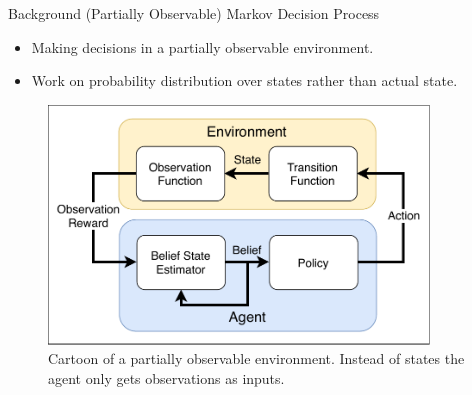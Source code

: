 \begin{exampleblock}{Background}
\Large{(Partially Observable) Markov Decision Process}

\normalsize

\begin{itemize}
    \item Making decisions in a partially observable environment.
    \item Work on probability distribution over states rather than actual state.
\end{itemize}
\begin{figure}
  \centering
    \includegraphics[width=0.9\textwidth]{img/background/POMDP}
  \caption{Cartoon of a partially observable environment. Instead of states the agent only gets observations as inputs.}
  
\end{figure}






\end{exampleblock}
